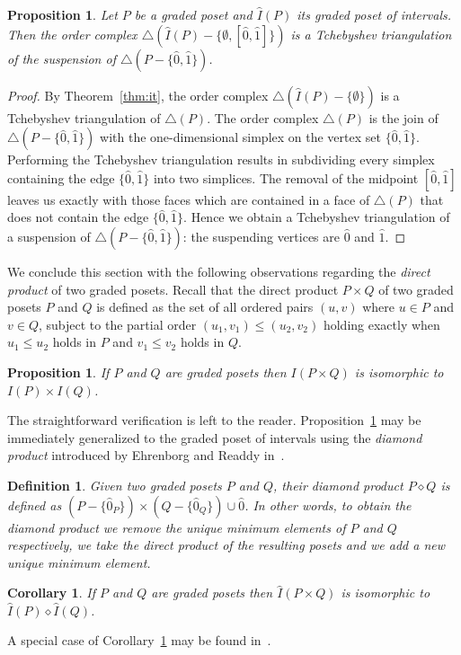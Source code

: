 \documentclass[reqno,12pt]{amsart}
\numberwithin{equation}{section}
\newtheorem{proposition}[theorem]{Proposition}
\newtheorem{definition}[theorem]{Definition}
\newtheorem{corollary}[theorem]{Corollary}
\newcommand{\0}{\widehat{0}}
\newcommand{\1}{\widehat{1}}
\newcommand{\2}{\widehat{2}}
\newcommand{\grI}{\widehat{I}}
\begin{document}
\begin{proposition}
\label{prop:ipgraded}
Let $P$ be a graded poset and $\grI(P)$ its graded poset of intervals.
Then the order complex $\triangle(\grI(P)- \{\emptyset, [\0,\1]\})$
is a Tchebyshev triangulation of the suspension of $\triangle(P-\{\0,\1\})$. 
\end{proposition}
\begin{proof}
By Theorem~\ref{thm:it}, the order complex
$\triangle(\grI(P)-\{\emptyset\})$ is a Tchebyshev triangulation of
$\triangle(P)$. The order complex $\triangle (P)$ is the join of
$\triangle(P-\{\0,\1\})$ with the one-dimensional simplex on the vertex
set $\{\0,\1\}$. Performing the Tchebyshev triangulation results in
subdividing every simplex containing the edge $\{\0,\1\}$ into two
simplices. The removal of the midpoint $[\0,\1]$ leaves us exactly with
those faces which are contained in a face of $\triangle (P)$ that does not
contain the edge $\{\0,\1\}$. Hence we obtain a Tchebyshev triangulation
of a suspension of $\triangle(P-\{\0,\1\})$: the suspending vertices are
$\0$ and $\1$.
\end{proof}  

We conclude this section with the following observations regarding the
{\em direct product} of two graded posets. Recall that the direct
product $P\times Q$ of two graded posets $P$ and $Q$ is defined as the
set of all ordered pairs $(u,v)$ where $u\in P$ and $v\in Q$, subject to
the partial order $(u_1,v_1)\leq (u_2,v_2)$ holding exactly when
$u_1\leq u_2$ holds in $P$ and $v_1\leq v_2$ holds in $Q$.

\begin{proposition}
\label{prop:cprod}  
If $P$ and $Q$ are graded posets then $I(P\times Q)$ is isomorphic to
$I(P)\times I(Q)$.
\end{proposition}
The straightforward verification is left to the reader.
Proposition~\ref{prop:cprod} may be immediately generalized to the 
graded poset of intervals using the   {\em diamond product} introduced
by Ehrenborg and Readdy in~\cite{Ehrenborg-Readdy-Tch}.
\begin{definition}
Given two graded posets $P$ and $Q$, their {\em diamond product}
$P\diamond Q$ is defined as $(P-\{\0_P\})\times (Q-\{\0_Q\})\cup \0$. In
  other words, to obtain the diamond product we remove the unique
  minimum elements of $P$ and $Q$ respectively, we take the direct
  product of the resulting posets and we add a new unique minimum element. 
\end{definition}
\begin{corollary}
\label{cor:cprod}    
If $P$ and $Q$ are graded posets then $\grI(P\times Q)$ is isomorphic to
$\grI(P)\diamond \grI(Q)$.
\end{corollary}  
A special case of Corollary~\ref{cor:cprod} may be found
in~\cite[Proposition 4 (iv)]{Jojic}.
\end{document}
